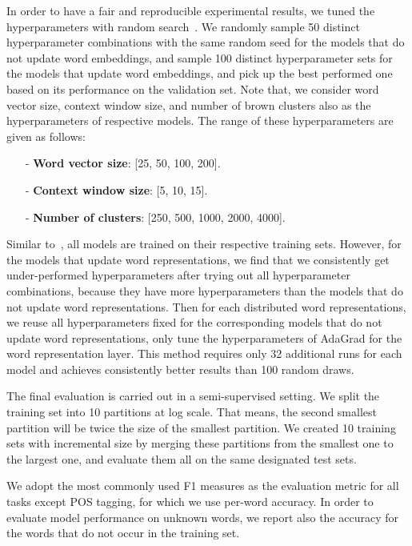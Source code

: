 In order to have a fair and reproducible experimental results, we tuned the hyperparameters with random search~\cite{bergstra2012random}. We randomly sample 50 distinct hyperparameter combinations with the same random seed for the models that do not update word embeddings, and sample 100 distinct hyperparameter sets for the models that update word embeddings, and pick up the best performed one based on its performance on the validation set. Note that, we consider word vector size, context window size, and number of brown clusters also as the hyperparameters of respective models. The range of these hyperparameters are given as follows:

\begin{small}
\begin{itemize}
\item[-]\textbf{Word vector size}: [25, 50, 100, 200].
\item[-]\textbf{Context window size}: [5, 10, 15].
\item[-]\textbf{Number of clusters}: [250, 500, 1000, 2000, 4000]. 
\end{itemize}
\end{small}

Similar to~\cite{turian2010word}, all models are trained on their respective training sets. However, for the models that update word representations, we find that we consistently get under-performed hyperparameters after trying out all hyperparameter combinations, because they have more hyperparameters than the models that do not update word representations. Then for each distributed word representations, we reuse all hyperparameters fixed for the corresponding models that do not update word representations, only tune the hyperparameters of AdaGrad for the word representation layer. This method requires only 32 additional runs for each model and achieves consistently better results than 100 random draws.

The final evaluation is carried out in a semi-supervised setting. We split the training set into 10 partitions at log scale. That means, the second smallest partition will be twice the size of the smallest partition. We created 10 training sets with incremental size by merging these partitions from the smallest one to the largest one, and evaluate them all on the same designated test sets. 

We adopt the most commonly used F1 measures as the evaluation metric for all tasks except POS tagging, for which we use per-word accuracy. In order to evaluate model performance on unknown words, we report also the accuracy for the words that do not occur in the training set.

